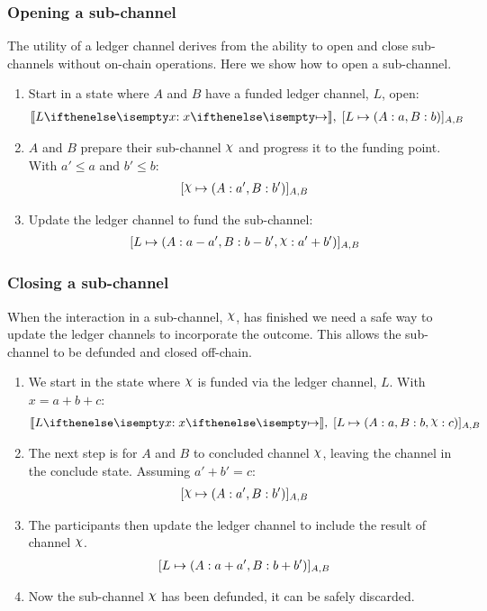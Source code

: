 \subsubsection{Opening a sub-channel}

The utility of a ledger channel derives from the ability to open and close sub-channels without on-chain operations.
Here we show how to open a sub-channel.
\begin{enumerate}
  \item Start in a state where $A$ and $B$ have a funded ledger channel, $L$, open:
  \begin{align}
    \adj{\holds{L}{x}{}}, \; \finalizable{L}{\alloc{A: a, B: b}}{A, B}
  \end{align}
  \item $A$ and $B$ prepare their sub-channel $\rchi$ and progress it to the funding point. With $a' \leq a$ and $b' \leq b$:
  \begin{align}
    \finalizable{\rchi}{\alloc{A:a', B:b'}}{A,B}
  \end{align}
  \item Update the ledger channel to fund the sub-channel:
  \begin{align}
    \finalizable{L}{\alloc{A:a-a', B: b - b', \rchi: a' + b'}}{A,B}
  \end{align}
\end{enumerate}

\subsubsection{Closing a sub-channel}

When the interaction in a sub-channel, $\rchi$, has finished we need a safe way to update the ledger channels to incorporate the outcome.
This allows the sub-channel to be defunded and closed off-chain.
\begin{enumerate}
  \item We start in the state where $\rchi$ is funded via the ledger channel, $L$. With $x = a + b + c$:
  \begin{align}
    \adj{\holds{L}{x}{}}, \; \finalizable{L}{\alloc{A: a, B: b, \rchi: c}}{A, B}
  \end{align}
  \item The next step is for $A$ and $B$ to concluded channel $\rchi$, leaving the channel in the conclude state. Assuming $a' + b' = c$:
  \begin{align}
    \finalizable{\rchi}{\alloc{A:a', B:b'}}{A,B}
  \end{align}
  \item The participants then update the ledger channel to include the result of channel $\rchi$.
  \begin{align}
    [L \mapsto ( A: a+ a', B: b + b' )]_{A, B}
  \end{align}
  \item Now the sub-channel $\rchi$ has been defunded, it can be safely discarded.
\end{enumerate}

